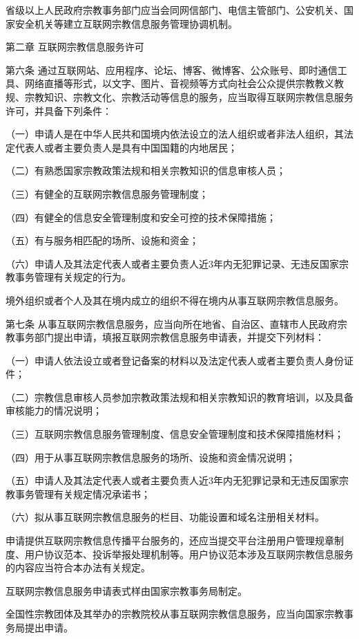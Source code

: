 \documentclass[UTF8, 11pt, oneside]{ctexart}
\newcommand{\juzhong}[1]{\begin{center}#1\end{center}}
\newcommand{\kongge}{\hspace{0.5em}}
\begin{document}
省级以上人民政府宗教事务部门应当会同网信部门、电信主管部门、公安机关、国家安全机关等建立互联网宗教信息服务管理协调机制。

\juzhong{第二章 \kongge 互联网宗教信息服务许可}

第六条 \kongge 通过互联网站、应用程序、论坛、博客、微博客、公众账号、即时通信工具、网络直播等形式，以文字、图片、音视频等方式向社会公众提供宗教教义教规、宗教知识、宗教文化、宗教活动等信息的服务，应当取得互联网宗教信息服务许可，并具备下列条件：

（一）申请人是在中华人民共和国境内依法设立的法人组织或者非法人组织，其法定代表人或者主要负责人是具有中国国籍的内地居民；

（二）有熟悉国家宗教政策法规和相关宗教知识的信息审核人员；

（三）有健全的互联网宗教信息服务管理制度；

（四）有健全的信息安全管理制度和安全可控的技术保障措施；

（五）有与服务相匹配的场所、设施和资金；

（六）申请人及其法定代表人或者主要负责人近3年内无犯罪记录、无违反国家宗教事务管理有关规定的行为。

境外组织或者个人及其在境内成立的组织不得在境内从事互联网宗教信息服务。

第七条 \kongge 从事互联网宗教信息服务，应当向所在地省、自治区、直辖市人民政府宗教事务部门提出申请，填报互联网宗教信息服务申请表，并提交下列材料：

（一）申请人依法设立或者登记备案的材料以及法定代表人或者主要负责人身份证件；

（二）宗教信息审核人员参加宗教政策法规和相关宗教知识的教育培训，以及具备审核能力的情况说明；

（三）互联网宗教信息服务管理制度、信息安全管理制度和技术保障措施材料；

（四）用于从事互联网宗教信息服务的场所、设施和资金情况说明；

（五）申请人及其法定代表人或者主要负责人近3年内无犯罪记录和无违反国家宗教事务管理有关规定情况承诺书；

（六）拟从事互联网宗教信息服务的栏目、功能设置和域名注册相关材料。

申请提供互联网宗教信息传播平台服务的，还应当提交平台注册用户管理规章制度、用户协议范本、投诉举报处理机制等。用户协议范本涉及互联网宗教信息服务的内容应当符合本办法有关规定。

互联网宗教信息服务申请表式样由国家宗教事务局制定。

全国性宗教团体及其举办的宗教院校从事互联网宗教信息服务，应当向国家宗教事务局提出申请。
\end{document}
